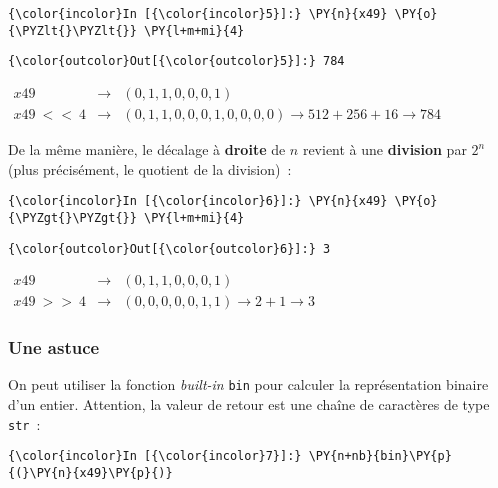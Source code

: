     \begin{Verbatim}[commandchars=\\\{\}]
{\color{incolor}In [{\color{incolor}5}]:} \PY{n}{x49} \PY{o}{\PYZlt{}\PYZlt{}} \PY{l+m+mi}{4}
\end{Verbatim}


\begin{Verbatim}[commandchars=\\\{\}]
{\color{outcolor}Out[{\color{outcolor}5}]:} 784
\end{Verbatim}
            
    \(\begin{array}{rcl} x49 & \rightarrow & (0,1,1,0,0,0,1) \\ x49\ <<\ 4 & \rightarrow & (0,1,1,0,0,0,1,0,0,0,0) \rightarrow 512 + 256 + 16 \rightarrow 784 \end{array}\)

    De la même manière, le décalage à \textbf{droite} de \(n\) revient à une
\textbf{division} par \(2^n\) (plus précisément, le quotient de la
division)~:

    \begin{Verbatim}[commandchars=\\\{\}]
{\color{incolor}In [{\color{incolor}6}]:} \PY{n}{x49} \PY{o}{\PYZgt{}\PYZgt{}} \PY{l+m+mi}{4}
\end{Verbatim}


\begin{Verbatim}[commandchars=\\\{\}]
{\color{outcolor}Out[{\color{outcolor}6}]:} 3
\end{Verbatim}
            
    \(\begin{array}{rcl} x49 & \rightarrow & (0,1,1,0,0,0,1) \\ x49\ >>\ 4 & \rightarrow & (0,0,0,0,0,1,1) \rightarrow 2 + 1 \rightarrow 3 \end{array}\)

    \hypertarget{une-astuce}{%
\subsubsection{Une astuce}\label{une-astuce}}

    On peut utiliser la fonction \emph{built-in} \texttt{bin} pour calculer
la représentation binaire d'un entier. Attention, la valeur de retour
est une chaîne de caractères de type \texttt{str}~:

    \begin{Verbatim}[commandchars=\\\{\}]
{\color{incolor}In [{\color{incolor}7}]:} \PY{n+nb}{bin}\PY{p}{(}\PY{n}{x49}\PY{p}{)}
\end{Verbatim}


